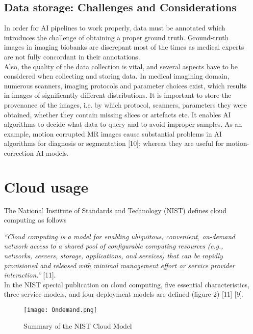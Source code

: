\subsection{Data storage:  Challenges and Considerations}

In order for AI pipelines to work properly, data must be annotated which introduces the challenge of obtaining a proper ground truth. Ground-truth images in imaging biobanks are discrepant most of the times as medical experts are not fully concordant in their annotations. \\
Also, the quality of the data collection is vital, and several aspects have to be considered when collecting and storing data.  In medical imagining domain, numerous scanners, imaging protocols and parameter choices exist, which results in images of significantly different distributions. It is important to store the provenance of the images, i.e. by which protocol, scanners, parameters they were obtained, whether they contain missing slices or artefacts etc. It enables AI algorithms to decide what data to query and to avoid improper samples. As an example, motion corrupted MR images cause substantial problems in AI algorithms for diagnosis or segmentation [10]; whereas they are useful for motion-correction AI models. 

\section{Cloud usage}

The National Institute of Standards and Technology (NIST) defines cloud computing as follows

\textit{“Cloud computing is a model for enabling ubiquitous, convenient, on-demand network access to a shared pool of configurable computing resources (e.g., networks, servers, storage, applications, and services) that can be rapidly provisioned and released with minimal management effort or service provider interaction.” }[11]. \\
In the NIST special publication on cloud computing, five essential characteristics, three service models, and four deployment models are defined (figure 2) [11] [9].



\begin{figure}[h!]
 \centering
  \texttt{[image: Ondemand.png]}
    \caption{Summary of the NIST Cloud Model}

  \label{fig:CDS}
\end{figure}


